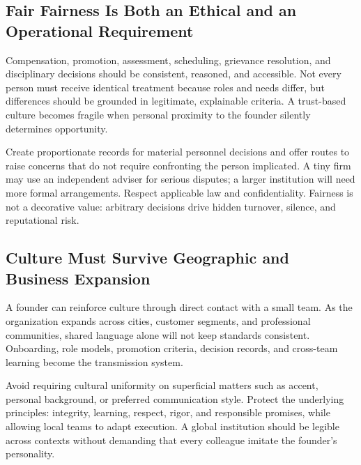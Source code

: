 \subsection{Fair Fairness Is Both an Ethical and an Operational Requirement}
\label{sec:fairness_ethical_operational}

Compensation, promotion, assessment, scheduling, grievance resolution, and disciplinary decisions should be consistent, reasoned, and accessible. Not every person must receive identical treatment because roles and needs differ, but differences should be grounded in legitimate, explainable criteria. A trust-based culture becomes fragile when personal proximity to the founder silently determines opportunity.

Create proportionate records for material personnel decisions and offer routes to raise concerns that do not require confronting the person implicated. A tiny firm may use an independent adviser for serious disputes; a larger institution will need more formal arrangements. Respect applicable law and confidentiality. Fairness is not a decorative value: arbitrary decisions drive hidden turnover, silence, and reputational risk.

\subsection{Culture Must Survive Geographic and Business Expansion}
\label{sec:culture_expansion}

A founder can reinforce culture through direct contact with a small team. As the organization expands across cities, customer segments, and professional communities, shared language alone will not keep standards consistent. Onboarding, role models, promotion criteria, decision records, and cross-team learning become the transmission system.

Avoid requiring cultural uniformity on superficial matters such as accent, personal background, or preferred communication style. Protect the underlying principles: integrity, learning, respect, rigor, and responsible promises, while allowing local teams to adapt execution. A global institution should be legible across contexts without demanding that every colleague imitate the founder's personality.
